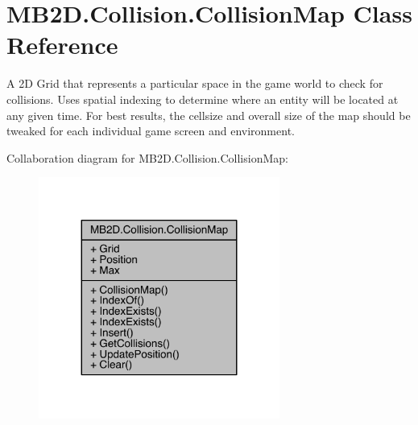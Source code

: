 \hypertarget{class_m_b2_d_1_1_collision_1_1_collision_map}{}\section{M\+B2\+D.\+Collision.\+Collision\+Map Class Reference}
\label{class_m_b2_d_1_1_collision_1_1_collision_map}


A 2D Grid that represents a particular space in the game world to check for collisions. Uses spatial indexing to determine where an entity will be located at any given time. For best results, the cellsize and overall size of the map should be tweaked for each individual game screen and environment.  




Collaboration diagram for M\+B2\+D.\+Collision.\+Collision\+Map\+:\nopagebreak
\begin{figure}[H]
\begin{center}
\leavevmode
\includegraphics[width=224pt]{class_m_b2_d_1_1_collision_1_1_collision_map__coll__graph}
\end{center}
\end{figure}
